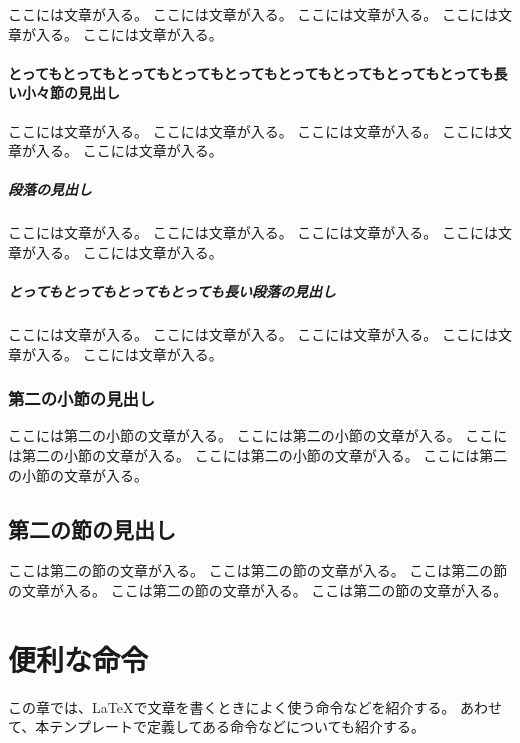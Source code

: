 \documentclass[ %
  a5paper,%
  papersize%
]{ltjsbook}
\begin{document}
ここには文章が入る。
ここには文章が入る。
ここには文章が入る。
ここには文章が入る。
ここには文章が入る。

\subsubsection{とってもとってもとってもとってもとってもとってもとってもとってもとっても長い小々節の見出し}

ここには文章が入る。
ここには文章が入る。
ここには文章が入る。
ここには文章が入る。
ここには文章が入る。

\paragraph{段落の見出し}

ここには文章が入る。
ここには文章が入る。
ここには文章が入る。
ここには文章が入る。
ここには文章が入る。

\paragraph{とってもとってもとってもとっても長い段落の見出し}

ここには文章が入る。
ここには文章が入る。
ここには文章が入る。
ここには文章が入る。
ここには文章が入る。

\subsection{第二の小節の見出し}

ここには第二の小節の文章が入る。
ここには第二の小節の文章が入る。
ここには第二の小節の文章が入る。
ここには第二の小節の文章が入る。
ここには第二の小節の文章が入る。

\section{第二の節の見出し}

ここは第二の節の文章が入る。
ここは第二の節の文章が入る。
ここは第二の節の文章が入る。
ここは第二の節の文章が入る。
ここは第二の節の文章が入る。

\chapter{便利な命令}

\begin{summary}
この章では、\LaTeX で文章を書くときによく使う命令などを紹介する。
あわせて、本テンプレートで定義してある命令などについても紹介する。
\end{summary}
\end{document}
